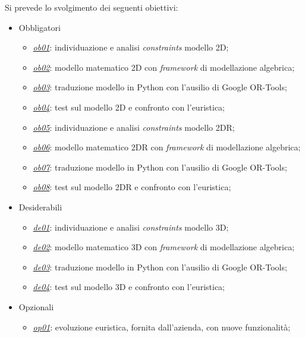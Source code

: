 Si prevede lo svolgimento dei seguenti obiettivi:
\begin{itemize}
	\item Obbligatori
	\begin{itemize}
		\item \underline{\textit{ob01}}: individuazione e analisi \textit{constraints} modello 2D;
		\item \underline{\textit{ob02}}: modello matematico 2D con \textit{framework} di modellazione algebrica;
		\item \underline{\textit{ob03}}: traduzione modello in Python con l'ausilio di Google OR-Tools;
		\item \underline{\textit{ob04}}: test sul modello 2D e confronto con l'euristica;
		\item \underline{\textit{ob05}}: individuazione e analisi \textit{constraints} modello 2DR; 
		\item \underline{\textit{ob06}}: modello matematico 2DR con \textit{framework} di modellazione algebrica;
		\item \underline{\textit{ob07}}: traduzione modello in Python con l'ausilio di Google OR-Tools;
		\item \underline{\textit{ob08}}: test sul modello 2DR e confronto con l'euristica;
    \end{itemize}
	\item Desiderabili
	\begin{itemize}
		\item \underline{\textit{de01}}: individuazione e analisi \textit{constraints} modello 3D;
		\item \underline{\textit{de02}}: modello matematico 3D con \textit{framework} di modellazione algebrica;
		\item \underline{\textit{de03}}: traduzione modello in Python con l'ausilio di Google OR-Tools;
		\item \underline{\textit{de04}}: test sul modello 3D e confronto con l'euristica;
	\end{itemize}
	\item Opzionali
	\begin{itemize}
		\item \underline{\textit{op01}}: evoluzione euristica, fornita dall'azienda, con nuove funzionalità;
	\end{itemize} 
\end{itemize}

